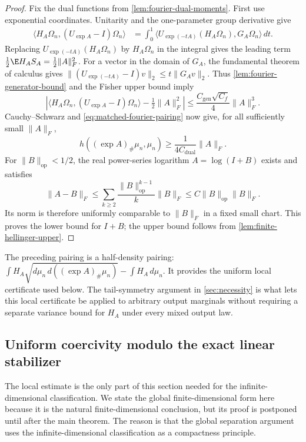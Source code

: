 \begin{proof}
Fix the dual functions from \cref{lem:fourier-dual-moments}.
First use exponential coordinates.  Unitarity and the
one-parameter group derivative give
\begin{align*}
 \langle H_A\Omega_n,(U_{\exp A}-I)\Omega_n\rangle
 &=\int_0^1
   \langle U_{\exp(-tA)}(H_A\Omega_n),G_A\Omega_n\rangle\,dt.
\end{align*}
Replacing $U_{\exp(-tA)}(H_A\Omega_n)$ by $H_A\Omega_n$ in the integral
gives the leading term $\tfrac12\E H_AS_A=\tfrac12\|A\|_F^2$.
For a vector in the domain of $G_A$, the fundamental theorem of
calculus gives
$\|(U_{\exp(-tA)}-I)v\|_2\le t\|G_Av\|_2$.
Thus \cref{lem:fourier-generator-bound} and the Fisher upper
bound imply
\[
 \left|\langle H_A\Omega_n,(U_{\exp A}-I)\Omega_n\rangle
                       -\tfrac12\|A\|_F^2\right|
 \le\frac{C_{\mathrm{gen}}\sqrt{C_f}}4\|A\|_F^3.
\]
Cauchy--Schwarz and \eqref{eq:matched-fourier-pairing} now
give, for all sufficiently small $\|A\|_F$,
\[
 h((\exp A)_\#\mu_n,\mu_n)
 \ge\frac{1}{4C_{\mathrm{dual}}}\|A\|_F.
\]
For $\|B\|_{\mathrm{op}}<1/2$, the real power-series logarithm
$A=\log(I+B)$ exists and satisfies
\[
 \|A-B\|_F
 \le\sum_{k\ge2}\frac{\|B\|_{\mathrm{op}}^{k-1}}{k}\|B\|_F
 \le C\|B\|_{\mathrm{op}}\|B\|_F.
\]
Its norm is therefore uniformly comparable to $\|B\|_F$ in a
fixed small chart.  This proves the lower bound for $I+B$;
the upper bound follows from
\cref{lem:finite-hellinger-upper}.
\end{proof}

The preceding pairing is a half-density pairing:
$\int H_A\sqrt{d\mu_n\,d((\exp A)_\#\mu_n)}-
\int H_A\,d\mu_n$.
It provides the uniform local certificate used below.
The tail-symmetry argument in \cref{sec:necessity} is what lets this local
certificate be applied to arbitrary output marginals without requiring a
separate variance bound for \(H_A\) under every mixed output law.

\subsection{Uniform coercivity modulo the exact linear stabilizer}
\label{sec:global-coercivity}

The local estimate is the only part of this section needed for the
infinite-dimensional classification.
We state the global finite-dimensional form here because it is the natural
finite-dimensional conclusion, but its proof is postponed until after the
main theorem.
The reason is that the global separation argument uses the
infinite-dimensional classification as a compactness principle.

